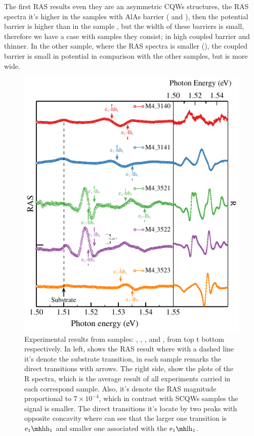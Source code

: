 The first RAS results even they are an asymmetric \gls{CQWs} structures, the  \gls{RAS} spectra it's higher in the samples with AlAs barrier ( and ), then the potential barrier is higher than in the sample , but the width of these barriers is small, therefore we have a case with samples they consist;  in high coupled barrier and thinner. 
In the other sample, where the \gls{RAS} spectra is smaller (), the coupled barrier is small in potential in comparison with the other samples, but is more wide. 
\begin{figure}[H]
	\centering
	\includegraphics[width=\textwidth]{../figures/chapter-3/ras-plots/out/ras-set-2.pdf}
	\caption{Experimental results from samples: , , ,  and , from top t bottom respectively. In left, shows the RAS result where with a dashed line it's denote the substrate transition, in each sample remarks the direct transitions with arrows. The right side, show the plots of the R spectra, which is the average result of all experiments carried in each correspond sample. Also, it's denote the \gls{RAS} magnitude proportional to $7\times 10^{-4}$, which in contrast with \gls{SCQWs} samples the signal is smaller. The direct transitions  it's locate by two peaks with opposite concavity where can see that the larger one transition is $\thh{1}{1}$  and  smaller one associated with the $\tlh{1}{1}$.}
	\label{fig:chapter-3-subsec-ras-plots-set-2}
\end{figure}
